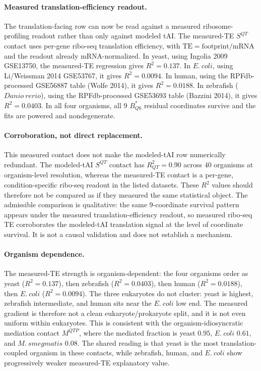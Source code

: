 \paragraph{Measured translation-efficiency readout.}
The translation-facing row can now be read against a measured ribosome-profiling readout rather than only against modeled tAI.  The measured-TE $S^{QT}$ contact uses per-gene ribo-seq translation efficiency, with $\mathrm{TE}=\mathrm{footprint}/\mathrm{mRNA}$ and the readout already mRNA-normalized.  In yeast, using Ingolia 2009 GSE13750, the measured-TE regression gives $R^2=0.137$.  In $E.\ coli$, using Li/Weissman 2014 GSE53767, it gives $R^2=0.0094$.  In human, using the RPFdb-processed GSE56887 table (Wolfe 2014), it gives $R^2=0.0188$.  In zebrafish ($Danio\ rerio$), using the RPFdb-processed GSE53693 table (Bazzini 2014), it gives $R^2=0.0403$.  In all four organisms, all $9$ $B^*_{Q6}$ residual coordinates survive and the fits are powered and nondegenerate.

\paragraph{Corroboration, not direct replacement.}
This measured contact does not make the modeled-tAI row numerically redundant.  The modeled-tAI $S^{QT}$ contact has $R^2_{QT}=0.90$ across $40$ organisms at organism-level resolution, whereas the measured-TE contact is a per-gene, condition-specific ribo-seq readout in the listed datasets.  These $R^2$ values should therefore not be compared as if they measured the same statistical object.  The admissible comparison is qualitative: the same $9$-coordinate survival pattern appears under the measured translation-efficiency readout, so measured ribo-seq TE corroborates the modeled-tAI translation signal at the level of coordinate survival.  It is not a causal validation and does not establish a mechanism.

\paragraph{Organism dependence.}
The measured-TE strength is organism-dependent: the four organisms order as yeast ($R^2=0.137$), then zebrafish ($R^2=0.0403$), then human ($R^2=0.0188$), then $E.\ coli$ ($R^2=0.0094$).  The three eukaryotes do not cluster: yeast is highest, zebrafish intermediate, and human sits near the $E.\ coli$ low end.  The measured gradient is therefore not a clean eukaryote/prokaryote split, and it is not even uniform within eukaryotes.  This is consistent with the organism-idiosyncratic mediation contact $M^{QTP}$, where the mediated fraction is yeast $0.95$, $E.\ coli$ $0.61$, and $M.\ smegmatis$ $0.08$.  The shared reading is that yeast is the most translation-coupled organism in these contacts, while zebrafish, human, and $E.\ coli$ show progressively weaker measured-TE explanatory value.

